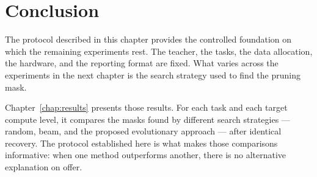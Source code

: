 \section{Conclusion}
\label{sec:protocol-conclusion}

The protocol described in this chapter provides the controlled foundation on
which the remaining experiments rest. The teacher, the tasks, the data
allocation, the hardware, and the reporting format are fixed. What varies across
the experiments in the next chapter is the search strategy used to find the
pruning mask.

Chapter~\ref{chap:results} presents those results. For each task and each target
compute level, it compares the masks found by different search strategies ---
random, beam, and the proposed evolutionary approach --- after identical recovery.
The protocol established here is what makes those comparisons informative: when
one method outperforms another, there is no alternative explanation on offer.